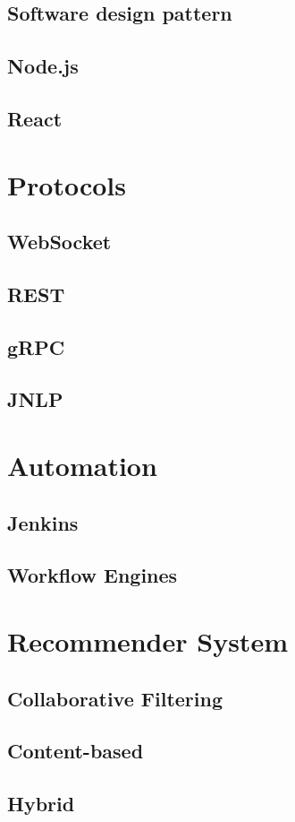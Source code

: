 \subsection{Software design pattern}
\subsection{Node.js}
\subsection{React}

\section{Protocols}
\subsection{WebSocket}
\subsection{REST}
\subsection{gRPC}
\subsection{JNLP}

\section{Automation}
\subsection{Jenkins}
\subsection{Workflow Engines}

\section{Recommender System}
\subsection{Collaborative Filtering}
\subsection{Content-based}
\subsection{Hybrid}
